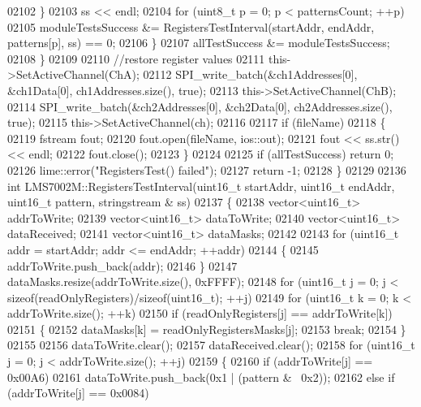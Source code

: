 \begin{DoxyCode}
{{{{{{{{{{{{{{{{{{{{{{{{{{{{{{{{{{{{{{{{{{{{{{{{{{{{{{{{{02102         \}
02103             ss << endl;
02104             \textcolor{keywordflow}{for} (uint8\_t p = 0; p < patternsCount; ++p)
02105                 moduleTestsSuccess &= RegistersTestInterval(startAddr, endAddr, patterns[p], ss) == 0;
02106         \}
02107         allTestSuccess &= moduleTestsSuccess;
02108     \}
02109 
02110     \textcolor{comment}{//restore register values}
02111     this->SetActiveChannel(ChA);
02112     SPI_write_batch(&ch1Addresses[0], &ch1Data[0], ch1Addresses.size(), \textcolor{keyword}{true});
02113     this->SetActiveChannel(ChB);
02114     SPI_write_batch(&ch2Addresses[0], &ch2Data[0], ch2Addresses.size(), \textcolor{keyword}{true});
02115     this->SetActiveChannel(ch);
02116 
02117     \textcolor{keywordflow}{if} (fileName)
02118     \{
02119         fstream fout;
02120         fout.open(fileName, ios::out);
02121         fout << ss.str() << endl;
02122         fout.close();
02123     \}
02124 
02125     \textcolor{keywordflow}{if} (allTestSuccess) \textcolor{keywordflow}{return} 0;
02126     lime::error(\textcolor{stringliteral}{"RegistersTest() failed"});
02127     \textcolor{keywordflow}{return} -1;
02128 \}
02129 
02136 \textcolor{keywordtype}{int} LMS7002M::RegistersTestInterval(uint16\_t startAddr, uint16\_t endAddr, uint16\_t pattern, stringstream &
      ss)
02137 \{
02138     vector<uint16\_t> addrToWrite;
02139     vector<uint16\_t> dataToWrite;
02140     vector<uint16\_t> dataReceived;
02141     vector<uint16\_t> dataMasks;
02142 
02143     \textcolor{keywordflow}{for} (uint16\_t addr = startAddr; addr <= endAddr; ++addr)
02144     \{
02145         addrToWrite.push\_back(addr);
02146     \}
02147     dataMasks.resize(addrToWrite.size(), 0xFFFF);
02148     \textcolor{keywordflow}{for} (uint16\_t j = 0; j < \textcolor{keyword}{sizeof}(readOnlyRegisters)/\textcolor{keyword}{sizeof}(uint16\_t); ++j)
02149         \textcolor{keywordflow}{for} (uint16\_t k = 0; k < addrToWrite.size(); ++k)
02150             \textcolor{keywordflow}{if} (readOnlyRegisters[j] == addrToWrite[k])
02151             \{
02152                 dataMasks[k] = readOnlyRegistersMasks[j];
02153                 \textcolor{keywordflow}{break};
02154             \}
02155 
02156     dataToWrite.clear();
02157     dataReceived.clear();
02158     \textcolor{keywordflow}{for} (uint16\_t j = 0; j < addrToWrite.size(); ++j)
02159     \{
02160         \textcolor{keywordflow}{if} (addrToWrite[j] == 0x00A6)
02161             dataToWrite.push\_back(0x1 | (pattern & ~0x2));
02162         \textcolor{keywordflow}{else} \textcolor{keywordflow}{if} (addrToWrite[j] == 0x0084)
}}}}}}}}}}}}}}}}}}}}}}}}}}}}}}}}}}}}}}}}}}}}}}}}}}}}}}}}}
\end{DoxyCode}
